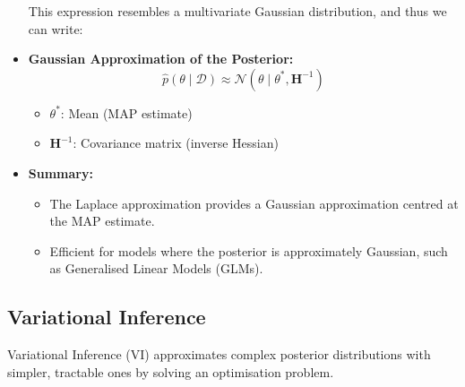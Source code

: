 \begin{itemize}
          This expression resembles a multivariate Gaussian distribution, and thus we can write:
    \item \textbf{Gaussian Approximation of the Posterior:}
          \[
              \hat{p}(\theta \mid \mathcal{D}) \approx \mathcal{N}(\theta \mid \theta^*, \mathbf{H}^{-1})
          \]
          \begin{itemize}
              \item $\theta^{*}$: Mean (MAP estimate)
              \item $\mathbf{H}^{-1}$: Covariance matrix (inverse Hessian)
          \end{itemize}
    \item \textbf{Summary:}
          \begin{itemize}
              \item The Laplace approximation provides a Gaussian approximation centred at the MAP estimate.
              \item Efficient for models where the posterior is approximately Gaussian, such as Generalised Linear Models (GLMs).
          \end{itemize}
\end{itemize}

\subsection{Variational Inference}

Variational Inference (VI) approximates complex posterior distributions with simpler, tractable ones by solving an optimisation problem.

